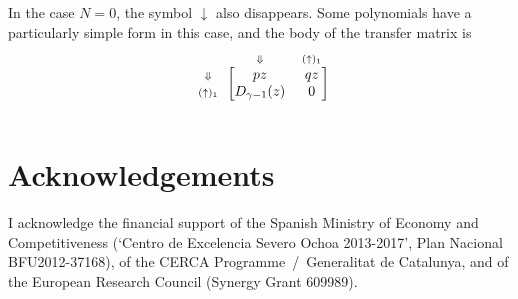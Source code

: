 \documentclass{article}
\newcommand{\DN}{\scriptstyle{\Downarrow}}
\newcommand{\up}[1]{\scriptstyle{(\uparrow)_{#1}}}
\begin{document}
In the case $N = 0$, the symbol $\downarrow$ also disappears. Some
polynomials have a particularly simple form in this case, and the
body of the transfer matrix is
\begin{equation*}
\begin{blockarray}{ccc}
   & \DN & \up{1} \\
\begin{block}{c[cc]}
\DN    & pz              & qz \\
\up{1} & D_{\gamma-1}(z) & 0  \\
\end{block}
\end{blockarray}
\end{equation*}


\section*{Acknowledgements}

I acknowledge the financial support of the Spanish Ministry of Economy and
Competitiveness (‘Centro de Excelencia Severo Ochoa 2013-2017’, Plan
Nacional BFU2012-37168), of the CERCA Programme~/~Generalitat de
Catalunya, and of the European Research Council (Synergy Grant 609989).






\end{document}
